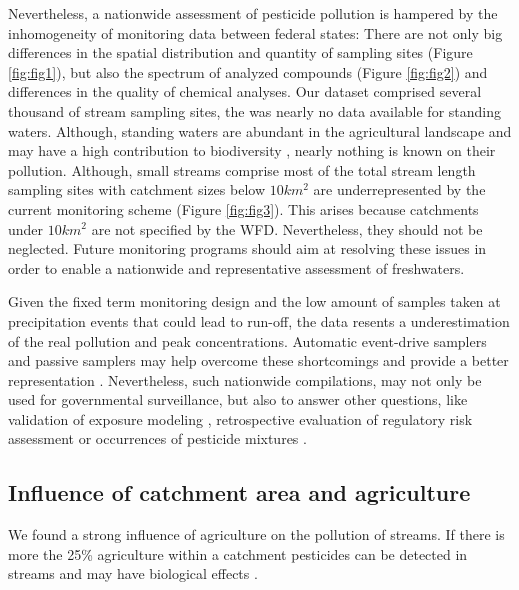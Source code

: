 \documentclass[journal=esthag,manuscript=article]{achemso}
\begin{document}
Nevertheless, a nationwide assessment of pesticide pollution is hampered by the inhomogeneity of monitoring data between federal states:
There are not only big differences in the spatial distribution and quantity of sampling sites (Figure \ref{fig:fig1}), but also the spectrum of analyzed compounds (Figure \ref{fig:fig2}) and differences in the quality of chemical analyses.
Our dataset comprised several thousand of stream sampling sites, the was nearly no data available for standing waters. 
Although, standing waters are abundant in the agricultural landscape and may have a high contribution to biodiversity \citep{davies_comparison_2008}, nearly nothing is known on their pollution.
Although, small streams comprise most of the total stream length \citep{nadeau_hydrological_2007} sampling sites with catchment sizes below $10km^2$ are underrepresented by the current monitoring scheme (Figure \ref{fig:fig3}).
This arises because catchments under $10km^2$ are not specified by the WFD.
Nevertheless, they should not be neglected.
Future monitoring programs should aim at resolving these issues in order to enable a nationwide and representative assessment of freshwaters. 

Given the fixed term monitoring design \citep{stehle_probabilistic_2013} and the low amount of samples taken at precipitation events that could lead to run-off, the data resents a underestimation of the real pollution and peak concentrations.
Automatic event-drive samplers and passive samplers may help overcome these shortcomings and provide a better representation \citep{fernandez_calibration_2014,moschet_evaluation_2015}.
Nevertheless, such nationwide compilations, may not only be used for governmental surveillance, but also to answer other questions, like validation of exposure modeling \cite{knabel_fungicide_2014}, retrospective evaluation of regulatory risk assessment \citep{knauer_pesticides_2016,stehle_pesticide_2015}or occurrences of pesticide mixtures \cite{schreiner_pesticide_2016}.


\subsection{Influence of catchment area and agriculture}
We found a strong influence of agriculture on the pollution of streams.
If there is more the 25\% agriculture within a catchment pesticides can be detected in streams and may have biological effects .
\end{document}
